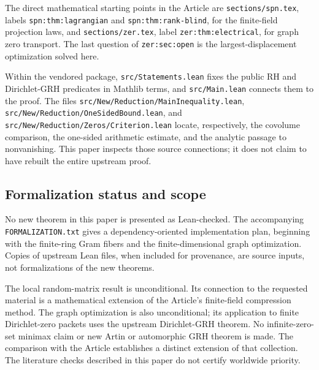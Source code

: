 The direct mathematical starting points in the Article are
\texttt{sections/spn.tex}, labels \texttt{spn:thm:lagrangian} and
\texttt{spn:thm:rank-blind}, for the finite-field projection laws, and
\texttt{sections/zer.tex}, label \texttt{zer:thm:electrical}, for graph
zero transport. The last question of \texttt{zer:sec:open} is the
largest-displacement optimization solved here.

Within the vendored package, \texttt{src/Statements.lean} fixes the public
RH and Dirichlet-GRH predicates in Mathlib terms, and
\texttt{src/Main.lean} connects them to the proof. The files
\nolinkurl{src/New/Reduction/MainInequality.lean},
\nolinkurl{src/New/Reduction/OneSidedBound.lean}, and
\nolinkurl{src/New/Reduction/Zeros/Criterion.lean} locate, respectively,
the covolume comparison, the one-sided arithmetic estimate, and the
analytic passage to nonvanishing. This paper inspects those source
connections; it does not claim to have rebuilt the entire upstream proof.

\subsection{Formalization status and scope}

No new theorem in this paper is presented as Lean-checked. The accompanying
\texttt{FORMALIZATION.txt} gives a dependency-oriented implementation plan,
beginning with the finite-ring Gram fibers and the finite-dimensional graph
optimization. Copies of upstream Lean files, when included for provenance,
are source inputs, not formalizations of the new theorems.

The local random-matrix result is unconditional. Its connection to the
requested material is a mathematical extension of the Article's
finite-field compression method. The graph optimization is also
unconditional; its application to finite Dirichlet-zero packets uses the
upstream Dirichlet-GRH theorem. No infinite-zero-set minimax claim or
new Artin or automorphic GRH theorem is made. The comparison with the
Article establishes a distinct extension of that collection. The
literature checks described in this paper do not certify worldwide
priority.
